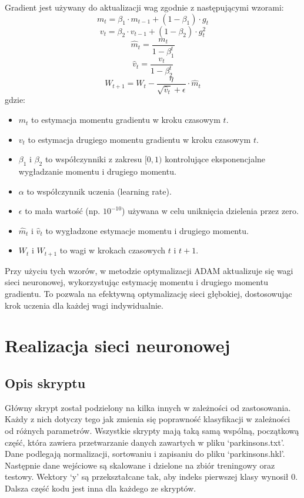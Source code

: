 \documentclass{article}
\begin{document}
Gradient jest używany do aktualizacji wag zgodnie z następującymi wzorami:
\[m_t = \beta_1 \cdot m_{t-1} + (1 - \beta_1) \cdot g_t\]
\[v_t = \beta_2 \cdot v_{t-1} + (1 - \beta_2) \cdot g_t^2\]
\[\hat{m}_t = \frac{m_t}{1 - \beta_1^t}\]
\[\hat{v}_t = \frac{v_t}{1 - \beta_2^t}\]
\[ W_{t+1} = W_t - \frac{\eta}{\sqrt{\hat{v}_t} + \epsilon} \cdot \hat{m}_t \]
gdzie:
\begin{itemize}
    \item \(m_t\) to estymacja momentu gradientu w kroku czasowym \(t\).
    \item \(v_t\) to estymacja drugiego momentu gradientu w kroku czasowym \(t\).
    \item \(\beta_1\) i \(\beta_2\) to współczynniki z zakresu \([0, 1)\) kontrolujące eksponencjalne wygładzanie momentu i drugiego momentu.
    \item \(\alpha\) to współczynnik uczenia (learning rate).
    \item \(\epsilon\) to mała wartość (np. \(10^{-10}\)) używana w celu uniknięcia dzielenia przez zero.
    \item \(\hat{m}_t\) i \(\hat{v}_t\) to wygładzone estymacje momentu i drugiego momentu.
    \item \(W_{t}\) i \(W_{t+1}\) to wagi w krokach czasowych \(t\) i \(t+1\).
\end{itemize}

Przy użyciu tych wzorów, w metodzie optymalizacji ADAM aktualizuje się wagi sieci neuronowej, wykorzystując estymację momentu i drugiego momentu gradientu.
To pozwala na efektywną optymalizację sieci głębokiej, dostosowując krok uczenia dla każdej wagi indywidualnie.

\newpage
\section{Realizacja sieci neuronowej}
\subsection{Opis skryptu}

Główny skrypt został podzielony na kilka innych w zależności od zastosowania.
Każdy z nich dotyczy tego jak zmienia się poprawność klasyfikacji w zależności od różnych parametrów.
Wszystkie skrypty mają taką samą wspólną, początkową część, która zawiera przetwarzanie danych zawartych w pliku `parkinsons.txt'.
Dane podlegają normalizacji, sortowaniu i zapisaniu do pliku `parkinsons.hkl'.
Następnie dane wejściowe są skalowane i dzielone na zbiór treningowy oraz testowy.
Wektory `y' są przekształcane tak, aby indeks pierwszej klasy wynosił 0.
Dalsza część kodu jest inna dla każdego ze skryptów.
\end{document}
